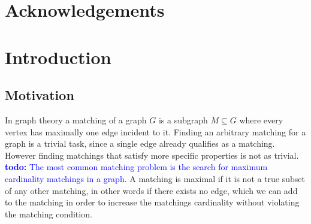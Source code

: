 \documentclass{article}      %
\newcommand\todo[1]{\textcolor{blue}{\textbf{todo: }#1}}
\begin{document}
\section*{Acknowledgements}






\pagebreak

\begin{abstract}

\end{abstract}

\pagebreak

\tableofcontents

\pagebreak

\section{Introduction}
\label{sec:intro}

\subsection{Motivation}
\label{sec:motivatio}

In graph theory a matching of a graph $G$ is a subgraph $M \subseteq G$ where every vertex has maximally one edge incident to it. Finding an arbitrary matching for a graph is a trivial task, since a single edge already qualifies as a matching. However finding matchings that satisfy more specific properties is not as trivial. \todo{The most common matching problem is the search for maximum cardinality matchings in a graph}. A matching is maximal if it is not a true subset of any other matching, in other words if there exists no edge, which we can add to the matching in order to increase the matchings cardinality without violating the matching condition.
\end{document}

